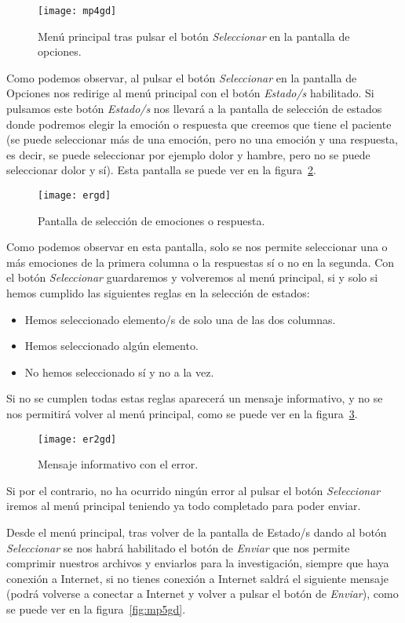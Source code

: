 \begin{figure}
	\centering
	\texttt{[image: mp4gd]}
	\caption{Menú principal tras pulsar el botón \textit{Seleccionar} en la pantalla de opciones.}
	\label{fig:mp4gd}
\end{figure}

Como podemos observar, al pulsar el botón \textit{Seleccionar} en la pantalla de Opciones nos redirige al menú principal con el botón \textit{Estado/s} habilitado. Si pulsamos este botón \textit{Estado/s} nos llevará a la pantalla de selección de estados donde podremos elegir la emoción o respuesta que creemos que tiene el paciente (se puede seleccionar más de una emoción, pero no una emoción y una respuesta, es decir, se puede seleccionar por ejemplo dolor y hambre, pero no se puede seleccionar dolor y sí). Esta pantalla se puede ver en la figura~\ref{fig:ergd}.

\begin{figure}[H]
	\centering
	\texttt{[image: ergd]}
	\caption{Pantalla de selección de emociones o respuesta.}
	\label{fig:ergd}
\end{figure}

Como podemos observar en esta pantalla, solo se nos permite seleccionar una o más emociones de la primera columna o la respuestas sí o no en la segunda. Con el botón \textit{Seleccionar} guardaremos y volveremos al menú principal, si y solo si hemos cumplido las siguientes reglas en la selección de estados:
\begin{itemize}
	\item Hemos seleccionado elemento/s de solo una de las dos columnas.
	\item Hemos seleccionado algún elemento.
	\item No hemos seleccionado sí y no a la vez.
\end{itemize}

Si no se cumplen todas estas reglas aparecerá un mensaje informativo, y no se nos permitirá volver al menú principal, como se puede ver en la figura~\ref{fig:er2gd}.
\begin{figure}
	\centering
	\texttt{[image: er2gd]}
	\caption{Mensaje informativo con el error.}
	\label{fig:er2gd}
\end{figure}
Si por el contrario, no ha ocurrido ningún error al pulsar el botón \textit{Seleccionar} iremos al menú principal teniendo ya todo completado para poder enviar.

Desde el menú principal, tras volver de la pantalla de Estado/s dando al botón \textit{Seleccionar} se nos habrá habilitado el botón de \textit{Enviar} que nos permite comprimir nuestros archivos y enviarlos para la investigación, siempre que haya conexión a Internet, si no tienes conexión a Internet saldrá el siguiente mensaje (podrá volverse a conectar a Internet y volver a pulsar el botón de \textit{Enviar}), como se puede ver en la figura~\ref{fig:mp5gd}.

